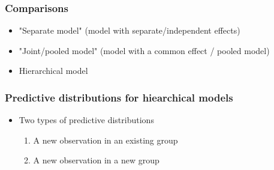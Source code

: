 \documentclass[10pt]{beamer}
\begin{document}
\begin{frame}

\frametitle{Comparisons}
	\begin{itemize}
    \item<+-> "Separate model" (model with separate/independent effects)
        \begin{xy}
        \end{xy}
     \item<+-> "Joint/pooled model" (model with a common effect / pooled model)
        \begin{xy}
                  \end{xy}
      \item<+-> Hierarchical model\\
        \vspace{-.5\baselineskip}\hspace{0cm}
        \begin{xy}
        \end{xy}
  \end{itemize}

\end{frame}

\begin{frame}
\frametitle{Predictive distributions for hiearchical models}

  \begin{itemize}
    \item Two types of predictive distributions
    \begin{enumerate}
      \item A new observation in {\color{uured} an existing group}
      \item A new observation in {\color{uured} a new group}
    \end{enumerate}
        \begin{xy}
        \end{xy}
  \end{itemize}
\end{frame}
\end{document}
